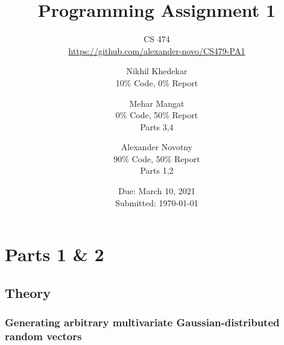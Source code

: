 \documentclass[headings=optiontoheadandtoc,listof=totoc,parskip=full]{scrartcl}
\title{Programming Assignment 1}
\subtitle{CS 474\\\url{https://github.com/alexander-novo/CS479-PA1}}
\author{Nikhil Khedekar\\10\% Code, 0\% Report \and Mehar Mangat\\0\% Code,  50\% Report\\ Parts 3,4  \and Alexander Novotny\\90\% Code, 50\% Report\\ Parts 1,2}
\date{Due: March 10, 2021 \\ Submitted: \today}
\begin{document}
\maketitle
\tableofcontents
{}

\newpage
{}

\section{Parts 1 \& 2}
\label{sec:part-1}

\subsection{Theory}

\subsubsection{Generating arbitrary multivariate Gaussian-distributed random vectors}
\end{document}
